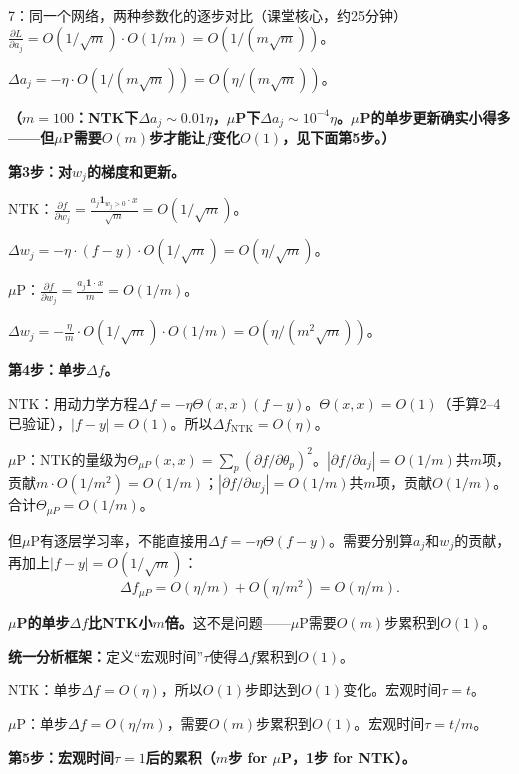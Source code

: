 \documentclass[11pt,a4paper]{article}
\begin{document}
\begin{handcalc}{7：同一个网络，两种参数化的逐步对比（课堂核心，约25分钟）}
$\frac{\partial L}{\partial a_j} = O(1/\sqrt{m})\cdot O(1/m) = O(1/(m\sqrt{m}))$。

$\Delta a_j = -\eta\cdot O(1/(m\sqrt{m})) = O(\eta/(m\sqrt{m}))$。

\textbf{（$m=100$：NTK下$\Delta a_j\sim 0.01\eta$，$\mu$P下$\Delta a_j\sim 10^{-4}\eta$。$\mu$P的单步更新确实小得多——但$\mu$P需要$O(m)$步才能让$f$变化$O(1)$，见下面第5步。）}

\bigskip
\textbf{第3步：对$w_j$的梯度和更新。}

NTK：$\frac{\partial f}{\partial w_j} = \frac{a_j\mathbf{1}_{w_j>0}\cdot x}{\sqrt{m}} = O(1/\sqrt{m})$。

$\Delta w_j = -\eta\cdot(f-y)\cdot O(1/\sqrt{m}) = O(\eta/\sqrt{m})$。

\medskip
$\mu$P：$\frac{\partial f}{\partial w_j} = \frac{a_j\mathbf{1}\cdot x}{m} = O(1/m)$。

$\Delta w_j = -\frac{\eta}{m}\cdot O(1/\sqrt{m})\cdot O(1/m) = O(\eta/(m^2\sqrt{m}))$。

\bigskip
\textbf{第4步：单步$\Delta f$。}

NTK：用动力学方程$\Delta f = -\eta\Theta(x,x)(f-y)$。$\Theta(x,x)=O(1)$（手算2--4已验证），$|f-y|=O(1)$。所以$\Delta f_{\text{NTK}} = O(\eta)$。

$\mu$P：NTK的量级为$\Theta_{\mu P}(x,x)=\sum_p(\partial f/\partial\theta_p)^2$。$|\partial f/\partial a_j|=O(1/m)$共$m$项，贡献$m\cdot O(1/m^2)=O(1/m)$；$|\partial f/\partial w_j|=O(1/m)$共$m$项，贡献$O(1/m)$。合计$\Theta_{\mu P}=O(1/m)$。

但$\mu$P有逐层学习率，不能直接用$\Delta f=-\eta\Theta(f-y)$。需要分别算$a_j$和$w_j$的贡献，再加上$|f-y|=O(1/\sqrt{m})$：
\[
\Delta f_{\mu P} = O(\eta/m) + O(\eta/m^2) = O(\eta/m).
\]

\textbf{$\mu$P的单步$\Delta f$比NTK小$m$倍。}这不是问题——$\mu$P需要$O(m)$步累积到$O(1)$。

\bigskip
\textbf{统一分析框架：}定义``宏观时间''$\tau$使得$\Delta f$累积到$O(1)$。

NTK：单步$\Delta f=O(\eta)$，所以$O(1)$步即达到$O(1)$变化。宏观时间$\tau = t$。

$\mu$P：单步$\Delta f=O(\eta/m)$，需要$O(m)$步累积到$O(1)$。宏观时间$\tau = t/m$。

\bigskip
\textbf{第5步：宏观时间$\tau=1$后的累积（$m$步 for $\mu$P，1步 for NTK）。}


\end{handcalc}
\end{document}
